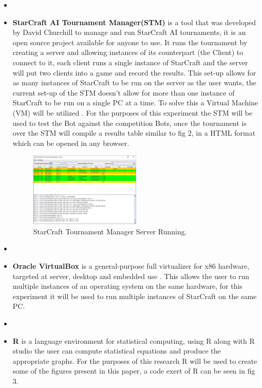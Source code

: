 \documentclass[journal]{IEEEtran}
\begin{document}
\begin{itemize}
	\item[]
	\item \textbf{StarCraft AI Tournament Manager(STM)} is a tool that was developed by David Churchill to manage and run StarCraft AI tournaments, it is an open source project available for anyone to use. It runs the tournament by creating a server and allowing instances of its counterpart (the Client) to connect to it, each client runs a single instance of StarCraft and the server will put two clients into a game and record the results. This set-up allows for as many instances of StarCraft to be run on the server as the user wants, the current set-up of the STM doesn't allow for more than one instance of StarCraft to be run on a single PC at a time. To solve this a Virtual Machine (VM) will be utilized \cite{Tournament}. For the purposes of this experiment the STM will be used to test the Bot against the competition Bots, once the tournament is over the STM will compile  a results table similar to fig 2, in a HTML format which can be opened in any browser.
	\begin{figure}
		\centering
		\includegraphics[width=0.5\textwidth]{TMPic}
		\caption{StarCraft Tournament Manager Server Running.}
		\label{Fig2}
	\end{figure}
	\item[]
	\item \textbf{Oracle VirtualBox} is a general-purpose full virtualizer for x86 hardware, targeted at server, desktop and embedded use \cite{Virtual}. This allows the user to run multiple instances of an operating system on the same hardware, for this experiment it will be used to run multiple instances of StarCraft on the same PC. 
	\item[]
	\item \textbf{R} is a language environment for statistical computing, using R along with R studio the user can compute statistical equations and produce the appropriate graphs. For the purposes of this research R will be used to create some of the figures present in this paper, a code exert of R can be seen in fig 3. 
	\newline
\end{itemize}
\end{document}
